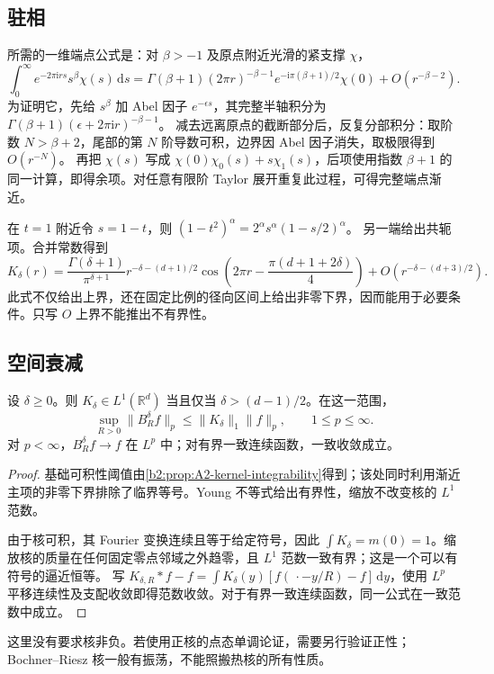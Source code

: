 \subsection{驻相}
\label{b2:subsec:240202}

所需的一维端点公式是：对 \(\beta>-1\) 及原点附近光滑的紧支撑 \(\chi\)，
\[
 \int_0^\infty e^{-2\pi\mathrm irs}s^\beta\chi(s)\,\mathrm ds
 =\Gamma(\beta+1)(2\pi r)^{-\beta-1}
       e^{-\mathrm i\pi(\beta+1)/2}\chi(0)+O(r^{-\beta-2}).
\]
为证明它，先给 \(s^\beta\) 加 Abel 因子 \(e^{-\epsilon s}\)，其完整半轴积分为
\(\Gamma(\beta+1)(\epsilon+2\pi\mathrm ir)^{-\beta-1}\)。
减去远离原点的截断部分后，反复分部积分：取阶数 \(N>\beta+2\)，尾部的第 \(N\) 阶导数可积，边界因 Abel 因子消失，取极限得到 \(O(r^{-N})\)。
再把 \(\chi(s)\) 写成 \(\chi(0)\chi_0(s)+s\chi_1(s)\)，后项使用指数 \(\beta+1\) 的同一计算，即得余项。对任意有限阶 Taylor 展开重复此过程，可得完整端点渐近。

\ProseParagraphBreak
在 \(t=1\) 附近令 \(s=1-t\)，则
\((1-t^2)^\alpha=2^\alpha s^\alpha(1-s/2)^\alpha\)。
另一端给出共轭项。合并常数得到
\[
 K_\delta(r)=
 \frac{\Gamma(\delta+1)}{\pi^{\delta+1}}
 r^{-\delta-(d+1)/2}
 \cos\!\left(2\pi r-\frac{\pi(d+1+2\delta)}4\right)
 +O(r^{-\delta-(d+3)/2}).
\]
此式不仅给出上界，还在固定比例的径向区间上给出非零下界，因而能用于必要条件。只写 \(O\) 上界不能推出不有界性。

\subsection{空间衰减}
\label{b2:subsec:240203}

\begin{theorem}[可积核范围]\label{b2:thm:24-integrable}
设 \(\delta\ge0\)。则 \(K_\delta\in L^1(\mathbb R^d)\) 当且仅当
\(\delta>(d-1)/2\)。在这一范围，
\[
 \sup_{R>0}\|B_R^\delta f\|_p\le\|K_\delta\|_1\|f\|_p,
 \qquad 1\le p\le\infty.
\]
对 \(p<\infty\)，\(B_R^\delta f\to f\) 在 \(L^p\) 中；对有界一致连续函数，一致收敛成立。
\end{theorem}
\begin{proof}
基础可积性阈值由\cref{b2:prop:A2-kernel-integrability}得到；该处同时利用渐近主项的非零下界排除了临界等号。Young 不等式给出有界性，缩放不改变核的 \(L^1\) 范数。

由于核可积，其 Fourier 变换连续且等于给定符号，因此
\(\int K_\delta=m(0)=1\)。缩放核的质量在任何固定零点邻域之外趋零，且 \(L^1\) 范数一致有界；这是一个可以有符号的逼近恒等。
写 \(K_{\delta,R}*f-f=\int K_\delta(y)[f(\,\cdot-y/R)-f]\,\mathrm dy\)，使用 \(L^p\) 平移连续性及支配收敛即得范数收敛。对于有界一致连续函数，同一公式在一致范数中成立。
\end{proof}
这里没有要求核非负。若使用正核的点态单调论证，需要另行验证正性；Bochner–Riesz 核一般有振荡，不能照搬热核的所有性质。

